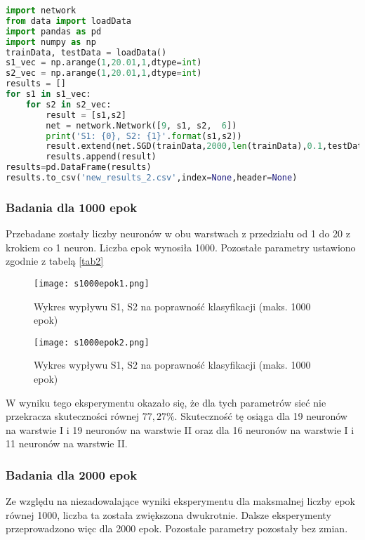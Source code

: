 \documentclass[12pt,twoside]{article}
\begin{document}
\begin{lstlisting}[language=Python,caption=Algorytm realizujący eksperyment 1,label={eks1}]
import network
from data import loadData
import pandas as pd
import numpy as np
trainData, testData = loadData()
s1_vec = np.arange(1,20.01,1,dtype=int)
s2_vec = np.arange(1,20.01,1,dtype=int)
results = []
for s1 in s1_vec:
    for s2 in s2_vec:
        result = [s1,s2]
        net = network.Network([9, s1, s2,  6])
        print('S1: {0}, S2: {1}'.format(s1,s2))
        result.extend(net.SGD(trainData,2000,len(trainData),0.1,testData,0.25,1.05,0.7))
        results.append(result)
results=pd.DataFrame(results)
results.to_csv('new_results_2.csv',index=None,header=None)

\end{lstlisting}

\subsubsection{Badania dla 1000 epok}
Przebadane zostały liczby neuronów w obu warstwach z przedziału od 1 do 20  z krokiem co 1 neuron. Liczba epok wynosiła 1000. Pozostałe parametry ustawiono zgodnie z tabelą \ref{tab2}

\begin{figure}[H]
\label{s1000epok1}
\centering
\texttt{[image: s1000epok1.png]}
\caption{Wykres wypływu S1, S2 na poprawność klasyfikacji (maks. 1000 epok)}
\end{figure}

\begin{figure}[H]
\label{s1000epok2}
\centering
\texttt{[image: s1000epok2.png]}
\caption{Wykres wypływu S1, S2 na poprawność klasyfikacji (maks. 1000 epok)}
\end{figure}

W wyniku tego eksperymentu okazało się, że dla tych parametrów sieć nie przekracza skuteczności równej $77,27\%$. Skuteczność tę osiąga dla 19 neuronów na warstwie I i 19 neuronów na warstwie II oraz dla 16 neuronów na warstwie I i 11 neuronów na warstwie II.

\subsubsection{Badania dla 2000 epok}
Ze względu na niezadowalające wyniki eksperymentu dla maksmalnej liczby epok równej 1000, liczba ta została zwiększona dwukrotnie. Dalsze eksperymenty przeprowadzono więc dla 2000 epok. Pozostałe parametry pozostały bez zmian.
\end{document}
